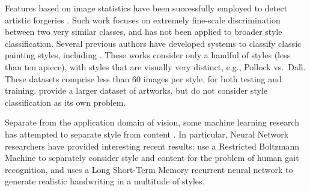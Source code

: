 Features based on image statistics have been successfully employed to detect artistic forgeries \parencite{Lyu-PNAS-2004}.
Such work focuses on extremely fine-scale discrimination between two very similar classes, and has not been applied to broader style classification.
Several previous authors have developed systems to classify classic painting styles, including \parencite{keren2002,shamir2010}.
These works consider only a handful of styles (less than ten apiece), with styles that are visually very distinct, e.g., Pollock vs.~Dal\'{\i}.
These datasets comprise less than 60 images per style, for both testing and training.
\cite{Mensink2014} provide a larger dataset of artworks, but do not consider style classification as its own problem.

Separate from the application domain of vision, some machine learning research has attempted to separate style from content \parencite{Tenenbaum2000}.
In particular, Neural Network researchers have provided interesting recent results: \cite{Taylor-ICML-2009} use a Restricted Boltzmann Machine to separately consider style and content for the problem of human gait recognition, and \cite{Graves-arxiv-2013} uses a Long Short-Term Memory recurrent neural network to generate realistic handwriting in a multitude of styles.
